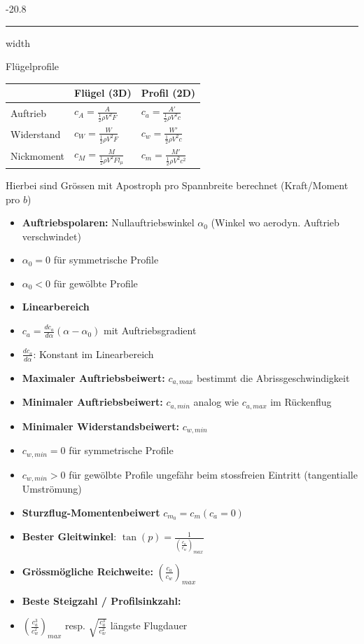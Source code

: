 \documentclass[8pt, landscape, fleqn]{scrartcl}
\makeatletter
\renewcommand{\subsubsection}{\@startsection{subsubsection}{1}{0mm}%
{-2\baselineskip}{0.8\baselineskip}%
{\hrule depth 0.2pt width\columnwidth\vspace*{1.2em}\normalsize\bfseries\rmfamily}}
\makeatother
\begin{document}
\begin{multicols*}{3}
\subsubsection{Flügelprofile}

\begin{tabular}{l | l l }
    & Flügel (3D) & Profil (2D) \\ 
    \hline
    Auftrieb & $c_A = \frac{A}{\frac{1}{2}\rho V^2 F}$& $c_a = \frac{A'}{\frac{1}{2}\rho V^2 c}$  \\
    \hline
    Widerstand & $c_W = \frac{W}{\frac{1}{2}\rho V^2 F}$ & $c_w = \frac{W'}{\frac{1}{2}\rho V^2 c}$ \\
    \hline
    Nickmoment & $c_M = \frac{M}{\frac{1}{2}\rho V^2 F l_\mu}$ & $c_m = \frac{M'}{\frac{1}{2}\rho V^2 c^2}$\\
    \hline
\end{tabular}
\newline \newline
Hierbei sind Grössen mit Apostroph pro Spannbreite berechnet (Kraft/Moment pro $b$)

\begin{itemize}
    \item \textbf{Auftriebspolaren:} Nullauftriebswinkel $\alpha_0$ (Winkel wo aerodyn. Auftrieb verschwindet)
    \item $\alpha_0 = 0$ für symmetrische Profile
    \item $\alpha_0 < 0$ für gewölbte Profile
    \item \textbf{Linearbereich}
    \item $c_a = \frac{dc_a}{d\alpha}(\alpha-\alpha_0)$ mit Auftriebsgradient 
    \item $\frac{dc_a}{d\alpha}$: Konstant im Linearbereich
    \item \textbf{Maximaler Auftriebsbeiwert:} $c_{a,max}$ bestimmt die Abrissgeschwindigkeit
    \item \textbf{Minimaler Auftriebsbeiwert:} $c_{a,min}$ analog wie $c_{a,max}$ im Rückenflug
    \item \textbf{Minimaler Widerstandsbeiwert:} $c_{w,min}$ 
    \item $c_{w,min} = 0$ für symmetrische Profile
    \item $c_{w,min} > 0$ für gewölbte Profile ungefähr beim stossfreien Eintritt (tangentialle Umströmung)
    \item \textbf{Sturzflug-Momentenbeiwert} $c_{m_0} = c_m(c_a = 0)$
    \item \textbf{Bester Gleitwinkel}: $\tan(p) = \frac{1}{(\frac{c_a}{c_w})_{max}}$
    \item \textbf{Grössmögliche Reichweite:} $(\frac{c_a}{c_w})_{max}$
    \item \textbf{Beste Steigzahl / Profilsinkzahl:}
    \item $(\frac{c_a^3}{c_w^2})_{max}$ resp. $\sqrt{\frac{c_a^3}{c_w^2}}$ längste Flugdauer 
\end{itemize}


\end{multicols*}
\end{document}
